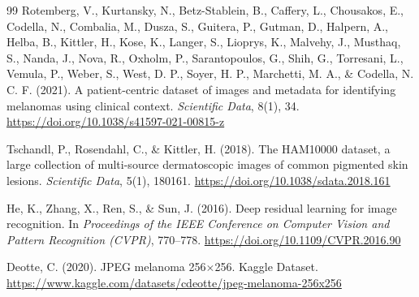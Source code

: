 \documentclass[12pt,a4paper]{article}
\begin{document}
\begin{thebibliography}{99}
Rotemberg, V., Kurtansky, N., Betz-Stablein, B., Caffery, L., Chousakos, E., Codella, N., Combalia, M., Dusza, S., Guitera, P., Gutman, D., Halpern, A., Helba, B., Kittler, H., Kose, K., Langer, S., Lioprys, K., Malvehy, J., Musthaq, S., Nanda, J., Nova, R., Oxholm, P., Sarantopoulos, G., Shih, G., Torresani, L., Vemula, P., Weber, S., West, D. P., Soyer, H. P., Marchetti, M. A., \& Codella, N. C. F. (2021). A patient-centric dataset of images and metadata for identifying melanomas using clinical context. \textit{Scientific Data}, 8(1), 34. \url{https://doi.org/10.1038/s41597-021-00815-z}

Tschandl, P., Rosendahl, C., \& Kittler, H. (2018). The HAM10000 dataset, a large collection of multi-source dermatoscopic images of common pigmented skin lesions. \textit{Scientific Data}, 5(1), 180161. \url{https://doi.org/10.1038/sdata.2018.161}

He, K., Zhang, X., Ren, S., \& Sun, J. (2016). Deep residual learning for image recognition. In \textit{Proceedings of the IEEE Conference on Computer Vision and Pattern Recognition (CVPR)}, 770--778. \url{https://doi.org/10.1109/CVPR.2016.90}

Deotte, C. (2020). JPEG melanoma 256$\times$256. Kaggle Dataset. \url{https://www.kaggle.com/datasets/cdeotte/jpeg-melanoma-256x256}

\end{thebibliography}
\end{document}

